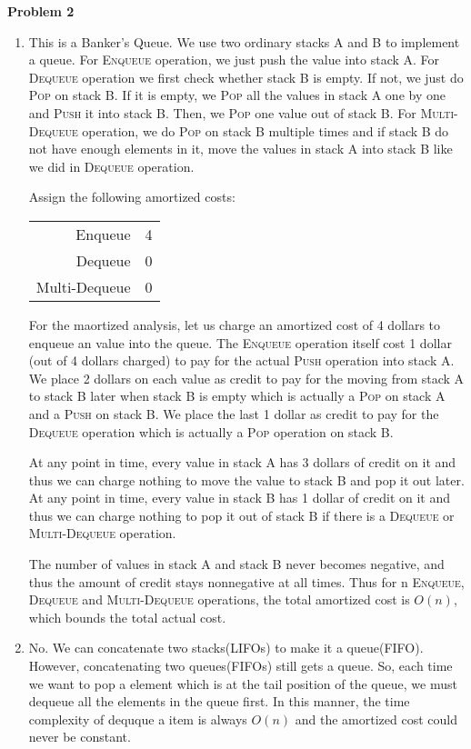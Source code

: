 \documentclass[12pt,letterpaper]{article}
\def\pp{\par\noindent}
\newcommand{\problem}[1]{ \bigskip \pp \textbf{Problem #1}\par}
\begin{document}
\problem{2}
\begin{enumerate}
	\item
		This is a Banker's Queue. We use two ordinary stacks A and B to implement a queue. For \textsc{Enqueue} operation, we just push the value into stack A. For \textsc{Dequeue} operation we first check whether stack B is empty. If not, we just do \textsc{Pop} on stack B. If it is empty, we \textsc{Pop} all the values in stack A one by one and \textsc{Push} it into stack B. Then, we \textsc{Pop} one value out of stack B. For \textsc{Multi-Dequeue} operation, we do \textsc{Pop} on stack B multiple times and if stack B do not have enough elements in it, move the values in stack A into stack B like we did in \textsc{Dequeue} operation.\par
		Assign the following amortized costs:\\
		\begin{center}
		\begin{tabular} {r c}
			Enqueue & 4 \\
			Dequeue & 0 \\
			Multi-Dequeue & 0 \\
		\end{tabular}
		\end{center}
		For the maortized analysis, let us charge an amortized cost of 4 dollars to enqueue an value into the queue. The \textsc{Enqueue} operation itself cost 1 dollar (out of 4 dollars charged) to pay for the actual \textsc{Push} operation into stack A. We place 2 dollars on each value as credit to pay for the moving from stack A to stack B later when stack B is empty which is actually a \textsc{Pop} on stack A and a \textsc{Push} on stack B. We place the last 1 dollar as credit to pay for the \textsc{Dequeue} operation which is actually a \textsc{Pop} operation on stack B.\par
		At any point in time, every value in stack A has 3 dollars of credit on it and thus we can charge nothing to move the value to stack B and pop it out later. At any point in time, every value in stack B has 1 dollar of credit on it and thus we can charge nothing to pop it out of stack B if there is a \textsc{Dequeue} or \textsc{Multi-Dequeue} operation.\par
		The number of values in stack A and stack B never becomes negative, and thus the amount of credit stays nonnegative at all times. Thus for n \textsc{Enqueue}, \textsc{Dequeue} and \textsc{Multi-Dequeue} operations, the total amortized cost is $O(n)$, which bounds the total actual cost.\par
	\item
		No. We can concatenate two stacks(LIFOs) to make it a queue(FIFO). However, concatenating two queues(FIFOs) still gets a queue. So, each time we want to pop a element which is at the tail position of the queue, we must dequeue all the elements in the queue first. In this manner, the time complexity of dequque a item is always $O(n)$ and the amortized cost could never be constant.
\end{enumerate}
\end{document}
